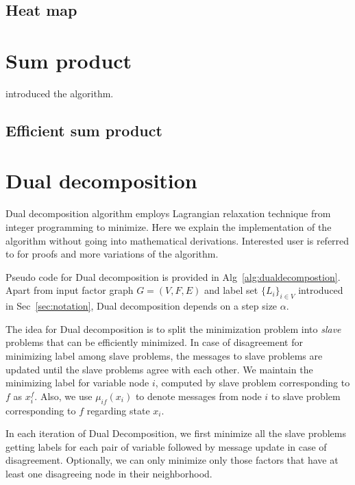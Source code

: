 \documentclass[letterpaper, 10 pt, conference]{ieeeconf} %
\begin{document}
\subsection{Heat map}
\section{Sum product}
\cite{kschischang2001factor} introduced the algorithm.
\subsection{Efficient sum product}
\section{Dual decomposition}
\newcommand{\msg}[3]{\mu_{#1#2}(#3)}
\newcommand{\assign}{\leftarrow}
\newcommand{\Sx}{L_i}
Dual decomposition algorithm employs Lagrangian relaxation technique from integer programming to minimize. Here we explain the implementation of the algorithm without going into mathematical derivations. Interested user is referred to \cite{sontag2011introduction,jojic2010accelerated,komodakis2009beyond} for proofs and more variations of the algorithm. 

Pseudo code for Dual decomposition is provided in Alg~\ref{alg:dualdecompostion}. Apart from input factor graph $G = (V, F, E)$ and label set $\{\Sx\}_{i \in V}$ introduced in Sec~\ref{sec:notation}, Dual decomposition depends on a step size $\alpha$.

The idea for Dual decomposition is to split the minimization problem into \emph{slave} problems that can be efficiently minimized. In case of disagreement for minimizing label among slave problems, the messages to slave problems are updated until the slave problems agree with each other. We maintain the minimizing label for variable node $i$, computed by slave problem corresponding to $f$ as $x^f_i$. Also, we use $\msg{i}{f}{x_i}$ to denote messages from node $i$ to slave problem corresponding to $f$ regarding state $x_i$.

In each iteration of Dual Decomposition, we first minimize all the slave problems getting labels for each pair of variable followed by message update in case of disagreement. Optionally, we can only minimize only those factors that have at least one disagreeing node in their neighborhood.
\end{document}
